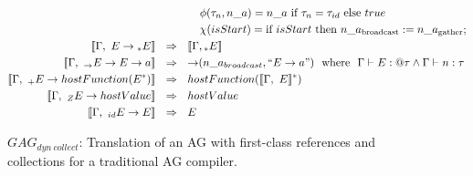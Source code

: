 \begin{figure*}
\begin{center}
\begin{align*}
& ~~~~~~~~~~~~ \phi (\tau_n, n \_ a) = n\_a ~ \text{if}  ~ \tau_{n} = \tau_{id}  ~ \text{else} ~ true \\
& ~~~~~~~~~~~~ \chi(isStart) = \text{if} ~ isStart ~ \text{then} ~ n\_a_\text{broadcast} := n\_a_\text{gather}; \\
\llbracket \Gamma, ~ E \rightarrow {_{*}E} \rrbracket & ~~ \Rightarrow ~~ \llbracket \Gamma, {_{*}E} \rrbracket \\
\llbracket \Gamma, ~ {_{\rightarrow}E} \rightarrow E \rightarrow a \rrbracket  & ~~ \Rightarrow ~~ {\rightarrow}(n\_a_{broadcast}, ``E \rightarrow a") ~~ \text{where} ~~ \Gamma \vdash E : @\tau \wedge \Gamma \vdash n : \tau \\
\llbracket \Gamma, ~ {_{+}E} \rightarrow hostFunction (E^{*}) \rrbracket & ~~ \Rightarrow ~~ hostFunction(\llbracket \Gamma, ~ E\rrbracket^{*}) \\
\llbracket \Gamma, ~ {_{Z}E} \rightarrow hostValue \rrbracket & ~~ \Rightarrow ~~ hostValue \\
\llbracket \Gamma, ~ {_{id}E} \rightarrow E \rrbracket & ~~ \Rightarrow ~~ E \\
\end{align*}

\end{center}
\caption{$GAG_{dyn~collect}$: Translation of an AG with first-class references and collections for a traditional AG compiler.}
\label{fig:statrewrites}
\end{figure*}